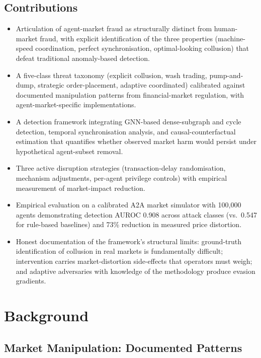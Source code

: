 \documentclass[sigconf,nonacm]{acmart}
\begin{document}
\subsection{Contributions}

\begin{itemize}
  \item Articulation of agent-market fraud as structurally distinct
        from human-market fraud, with explicit identification of the
        three properties (machine-speed coordination, perfect
        synchronisation, optimal-looking collusion) that defeat
        traditional anomaly-based detection.
  \item A five-class threat taxonomy (explicit collusion, wash
        trading, pump-and-dump, strategic order-placement, adaptive
        coordinated) calibrated against documented manipulation
        patterns from financial-market regulation, with
        agent-market-specific implementations.
  \item A detection framework integrating GNN-based dense-subgraph
        and cycle detection, temporal synchronisation analysis, and
        causal-counterfactual estimation that quantifies whether
        observed market harm would persist under hypothetical
        agent-subset removal.
  \item Three active disruption strategies (transaction-delay
        randomisation, mechanism adjustments, per-agent privilege
        controls) with empirical measurement of market-impact
        reduction.
  \item Empirical evaluation on a calibrated A2A market simulator
        with 100{,}000 agents demonstrating detection AUROC 0.908
        across attack classes (vs.\ 0.547 for rule-based baselines)
        and 73\% reduction in measured price distortion.
  \item Honest documentation of the framework's structural limits:
        ground-truth identification of collusion in real markets is
        fundamentally difficult; intervention carries market-distortion
        side-effects that operators must weigh; and adaptive adversaries
        with knowledge of the methodology produce evasion gradients.
\end{itemize}

\section{Background}

\subsection{Market Manipulation: Documented Patterns}
\end{document}
